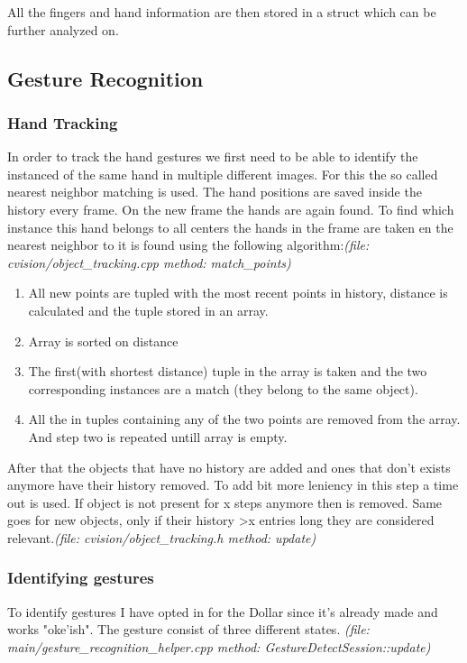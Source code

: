 \documentclass[11pt,a4paper]{article}
\begin{document}
All the fingers and hand information are then stored in a struct which can be further analyzed on.

\subsection{Gesture Recognition}
\subsubsection{Hand Tracking}
In order to track the hand gestures we first need to be able to identify the instanced of the same hand in multiple different images. For this the so called nearest neighbor matching is used. The hand positions are saved inside the history every frame. On the new frame the hands are again found. To find which instance this hand belongs to all centers the hands in the frame are taken en the nearest neighbor to it is found using the following algorithm:\textit{(file: cvision/object\_tracking.cpp method: match\_points)}\bigskip

\begin{enumerate}
\item All new points are tupled with the most recent points in history, distance is calculated and the tuple stored in an array.
\item Array is sorted on distance
\item The first(with shortest distance) tuple in the array is taken and the two corresponding instances are a match (they belong to the same object).
\item All the in tuples containing any of the two points are removed from the array. And step two is repeated untill array is empty.
\end{enumerate}

After that the objects that have no history are added and ones that don't exists anymore have their history removed. To add bit more leniency in this step a time out is used. If object is not present for x steps anymore then is removed. Same goes for new objects, only if their history >x entries long they are considered relevant.\textit{(file: cvision/object\_tracking.h method: update)}

\subsubsection{Identifying gestures}
To identify gestures I have opted in for the Dollar since it's already made and works "oke'ish". The gesture consist of three different states. \textit{(file: main/gesture\_recognition\_helper.cpp method: GestureDetectSession::update)}
\end{document}
